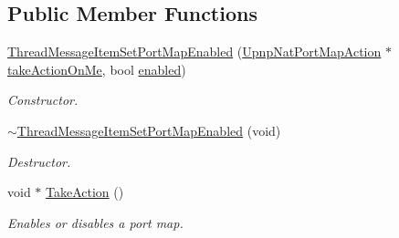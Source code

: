 \subsection*{Public Member Functions}
\begin{DoxyCompactItemize}
\item 
\hyperlink{class_thread_message_item_set_port_map_enabled_a7d87885f8c2e22162ebc5081d2b58e3c}{ThreadMessageItemSetPortMapEnabled} (\hyperlink{class_upnp_nat_port_map_action}{UpnpNatPortMapAction} $\ast$\hyperlink{class_thread_message_item_set_port_map_enabled_a723477d8abcd39952b292a9e0868bc71}{takeActionOnMe}, bool \hyperlink{class_thread_message_item_set_port_map_enabled_a5bbfca16d9ea393c002ac4c9720da28a}{enabled})
\begin{DoxyCompactList}\small\item\em Constructor. \item\end{DoxyCompactList}\item 
\hypertarget{class_thread_message_item_set_port_map_enabled_ac58dabcb8405e608ce2024491eebd888}{
\hyperlink{class_thread_message_item_set_port_map_enabled_ac58dabcb8405e608ce2024491eebd888}{$\sim$ThreadMessageItemSetPortMapEnabled} (void)}
\label{class_thread_message_item_set_port_map_enabled_ac58dabcb8405e608ce2024491eebd888}

\begin{DoxyCompactList}\small\item\em Destructor. \item\end{DoxyCompactList}\item 
void $\ast$ \hyperlink{class_thread_message_item_set_port_map_enabled_a73dd0cb3388b0844db57a7de83172ecb}{TakeAction} ()
\begin{DoxyCompactList}\small\item\em Enables or disables a port map. \item\end{DoxyCompactList}\end{DoxyCompactItemize}
